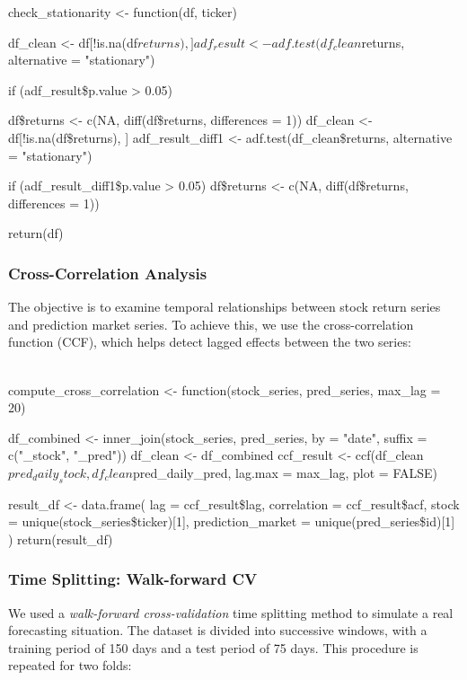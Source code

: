 \documentclass[12pt]{report}
\begin{document}
\begin{code}[language=R,caption={Stationarity test with successive differencing}]
check_stationarity <- function(df, ticker) {
  df_clean <- df[!is.na(df$returns), ]
  adf_result <- adf.test(df_clean$returns, alternative = "stationary")
  
  if (adf_result\$p.value > 0.05) {
    df\$returns <- c(NA, diff(df\$returns, differences = 1))
    df_clean <- df[!is.na(df\$returns), ]
    adf_result_diff1 <- adf.test(df_clean\$returns, alternative = "stationary")
    
    if (adf_result_diff1\$p.value > 0.05) {
      df\$returns <- c(NA, diff(df\$returns, differences = 1))
    }
  }
  return(df)
}
\end{code}

\subsubsection{Cross-Correlation Analysis}

The objective is to examine temporal relationships between stock return series and prediction market series. To achieve this, we use the cross-correlation function (CCF), which helps detect lagged effects between the two series:\\\\

\begin{code}[language=R,caption={Cross-correlation computation between prediction markets and stocks}]
compute_cross_correlation <- function(stock_series, pred_series, max_lag = 20) {
  df_combined <- inner_join(stock_series, pred_series, by = "date", suffix = c("_stock", "_pred"))
  df_clean <- df_combined %
  ccf_result <- ccf(df_clean$pred_daily_stock, df_clean$pred_daily_pred, lag.max = max_lag, plot = FALSE)
  
  result_df <- data.frame(
    lag = ccf_result\$lag,
    correlation = ccf_result\$acf,
    stock = unique(stock_series\$ticker)[1],
    prediction_market = unique(pred_series\$id)[1]
  )
  return(result_df)
}
\end{code}

\subsubsection{Time Splitting: Walk-forward CV}

We used a \textit{walk-forward cross-validation} time splitting method to simulate a real forecasting situation. The dataset is divided into successive windows, with a training period of 150 days and a test period of 75 days. This procedure is repeated for two folds:
\end{document}
